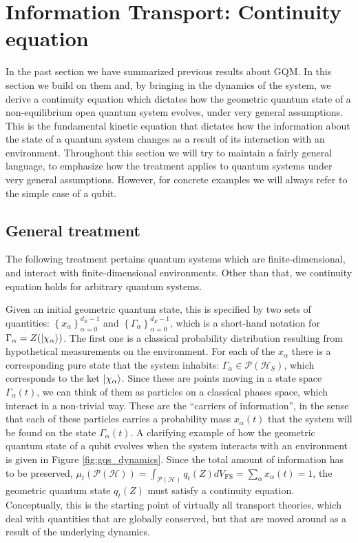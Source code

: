\documentclass[draft,nofootinbib,pre,twocolumn,showpacs,showkeys,preprintnumbers,floatfix]{revtex4-1}
\newcommand{\1}{\mathbbm{1}}
\newcommand{\PH}{\mathcal{P}(\mathcal{H})}
\begin{document}
\section{Information Transport: Continuity equation}
\label{sec:IT}

In the past section we have summarized previous results about GQM. In this 
section we build on them and, by bringing in the dynamics of the system, we derive 
a continuity equation which dictates how the geometric quantum state of a non-equilibrium 
open quantum system evolves, under very general assumptions. This is the fundamental 
kinetic equation that dictates how the information about the state of a quantum system 
changes as a result of its interaction with an environment. 
Throughout this section we will try to maintain a fairly general language, to emphasize
how the treatment applies to quantum systems under very general assumptions. However, 
for concrete examples we will always refer to the simple case of a qubit.



\subsection*{General treatment}
The following treatment pertains quantum systems which are finite-dimensional, and 
interact with finite-dimensional environments. Other than that, we continuity equation holds
for arbitrary quantum systems. 

Given an initial geometric quantum state, this is specified by two sets of quantities: $\left\{x_\alpha\right\}_{\alpha=0}^{d_E-1}$
and $\left\{ \Gamma_\alpha\right\}_{\alpha=0}^{d_E-1}$, which is a short-hand notation for 
$\Gamma_\alpha = Z(\ket{\chi_\alpha})$. The first one is a classical probability distribution
resulting from hypothetical measurements on the environment. For each of the $x_\alpha$
there is a corresponding pure state that the system inhabits: $\Gamma_\alpha \in \mathcal{P}(\mathcal{H}_S)$,
which corresponds to the ket $\ket{\chi_\alpha}$. Since these are points moving in a state space $\Gamma_\alpha(t)$,
we can think of them as particles on a classical phases space, which interact in a non-trivial
way. These are the ``carriers of information'', in the sense that each of these particles carries 
a probability mass $x_\alpha(t)$ that the system will be found on the state $\Gamma_\alpha(t)$.
A clarifying example of how the geometric quantum state of a qubit evolves when the system 
interacts with an environment is given in Figure \ref{fig:gqs_dynamics}. Since the total amount 
of information has to be preserved, $\mu_t(\PH) = \int_{\PH} q_t(Z) dV_{\mathrm{FS}} = \sum_\alpha x_\alpha(t) =1$,
the geometric quantum state $q_t(Z)$ must satisfy a continuity equation. Conceptually, this is 
the starting point of virtually all transport theories, which deal with quantities that are globally 
conserved, but that are moved around as a result of the underlying dynamics.
\end{document}
